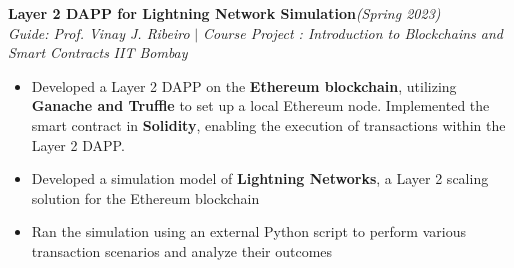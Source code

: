 \documentclass[a4paper,10pt]{article}
\begin{document}
\vspace{\baselineskip}
\vspace{-15pt}
\noindent\textbf{\large Layer 2 DAPP for Lightning Network Simulation}\hfill{\sl \small (Spring 2023)}\\
{\it Guide: Prof. Vinay J. Ribeiro} $|$ {\it Course Project : Introduction to Blockchains and Smart Contracts } \hfill{\it IIT Bombay}\\
\vspace{-15pt}
\begin{itemize}[itemsep = -0.65 mm, leftmargin=*]
    \item Developed a Layer 2 DAPP on the \textbf{Ethereum blockchain}, utilizing \textbf{Ganache and Truffle} to set up a local Ethereum node. Implemented the smart contract in \textbf{Solidity}, enabling the execution of transactions within the Layer 2 DAPP.
    \item Developed a simulation model of \textbf{Lightning Networks}, a Layer 2 scaling solution for the Ethereum blockchain
    \item Ran the simulation using an external Python script to perform various transaction scenarios and analyze their outcomes
\end{itemize}
\end{document}
